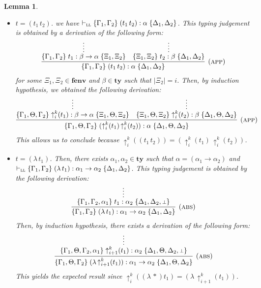 \documentclass[submission,creativecommons]{eptcs}
\newtheorem{lemma}{Lemma}
\newcommand{\mybox}{\raisebox{3.5pt}{\framebox[7pt]{\rule{0mm}{0.3pt}}}}
\def\qed{\ifmmode\mybox\else{\unskip\nobreak\hfil
\penalty50\hskip1em\null\nobreak\hfil\mybox
\parfillskip=0pt\finalhyphendemerits=0\endgraf}\fi}
\newenvironment{proof}{%

\vspace{.7ex}
\noindent{\it Proof.} \rm}{\qed}
\newcommand{\bt}{{\scriptstyle\bot}}
\newcommand{\iabs}[1]{(\lambda\,#1)}
\newcommand{\iapp}[2]{(#1\,#2)}
\newcommand{\liftt}[3]{{\uparrow}^{#2}_{#3}(#1)}
\newcommand{\tytm}[4]{\{#1\}\;#2:#3\;\{#4\}}
\newcommand{\der}[1]{\vdash_{#1}}
\newcommand{\Sll}{{\textsc{ll}}}
\newcommand{\ty}{\mathord{\mathbf{ty}}}
\newcommand{\fenv}{\mathord{\mathbf{fenv}}}
\begin{document}
\begin{lemma}
\begin{proof}
\begin{itemize}
\item $t = \iapp{t_1}{t_2}$.\quad
we have $\der{\Sll}\tytm{\Gamma_1, \Gamma_2}{\iapp{t_1}{t_2}}{\alpha}{\Delta_1, \Delta_2}$. This typing judgement is
obtained by a derivation of the following form:
\begin{align*}
\infer[\mbox{(\textsc{app})}]{
\tytm{\Gamma_1, \Gamma_2}{\iapp{t_1}{t_2}}{\alpha}{\Delta_1, \Delta_2}
}{
\infer*{\tytm{\Gamma_1, \Gamma_2}{t_1}{\beta \rightarrow \alpha}{\Xi_1, \Xi_2}}{}
&
\infer*{\tytm{\Xi_1, \Xi_2}{t_2}{\beta}{\Delta_1, \Delta_2}}{}
}
\end{align*}
for some $\Xi_1, \Xi_2 \in \fenv$ and $\beta \in \ty$ such that $|\Xi_2|=i$.
Then, by induction hypothesis, we obtained the following derivation:
\begin{align*}
\infer[\mbox{(\textsc{app})}]{
\tytm{\Gamma_1, \Theta, \Gamma_2}{\iapp{\liftt{t_1}{k}{i}}{\liftt{t_2}{k}{i}}}{\alpha}{\Delta_1, \Theta, \Delta_2}
}{
\infer*{\tytm{\Gamma_1, \Theta, \Gamma_2}{\liftt{t_1}{k}{i}}{\beta \rightarrow \alpha}{\Xi_1, \Theta, \Xi_2}}{}
&
\infer*{\tytm{\Xi_1, \Theta, \Xi_2}{\liftt{t_2}{k}{i}}{\beta}{\Delta_1, \Theta, \Delta_2}}{}
}
\end{align*}
This allows us to conclude because
$\liftt{\iapp{t_1}{t_2}}{k}{i} = \iapp{\liftt{t_1}{k}{i}}{\liftt{t_2}{k}{i}}$.

\item $t = \iabs{t_1}$. Then, there exists $\alpha_1, \alpha_2 \in \ty$ such that $\alpha = (\alpha_1\rightarrow\alpha_2)$ and
$\der{\Sll}\tytm{\Gamma_1, \Gamma_2}{\iabs{t_1}}{\alpha_1\rightarrow\alpha_2}{\Delta_1, \Delta_2}$. This typing judgement is
obtained by the following derivation: 
\begin{align*}
\infer[\mbox{(\textsc{abs})}]{
\tytm{\Gamma_1, \Gamma_2}{\iabs{t_1}}{\alpha_1 \rightarrow \alpha_2}{\Delta_1, \Delta_2}
}{
\infer*{\tytm{\Gamma_1, \Gamma_2, \alpha_1}{t_1}{\alpha_2}{\Delta_1, \Delta_2, \bt}}{}
}
\end{align*}
Then, by induction hypothesis, there exists a derivation of the following form:
\begin{align*}
\infer[\mbox{(\textsc{abs})}]{
\tytm{\Gamma_1, \Theta, \Gamma_2}{\iabs{\liftt{t_1}{k}{i + 1}}}{\alpha_1 \rightarrow \alpha_2}{\Delta_1, \Theta, \Delta_2}
}{
\infer*{\tytm{\Gamma_1, \Theta, \Gamma_2, \alpha_1}{\liftt{t_1}{k}{i + 1}}{\alpha_2}{\Delta_1, \Theta, \Delta_2, \bt}}{}
}
\end{align*}
This yields the expected result since $\liftt{\iabs*{t_1}}{k}{i} = \iabs{\liftt{t_1}{k}{i + 1}}$.
\end{itemize}
\end{proof}
\end{lemma}
\end{document}
